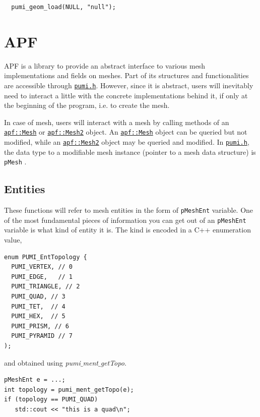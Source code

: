 \documentclass{article}
\begin{document}
\begin{lstlisting}
  pumi_geom_load(NULL, "null");
\end{lstlisting}

\section{APF}

APF is a library to provide an abstract interface to various mesh implementations and fields on meshes. Part of its structures and functionalities are accessible through \href{https://github.com/SCOREC/core/blob/master/pumi/pumi.h}{\texttt{pumi.h}}.   
However, since it is abstract, users will inevitably need to
interact a little with the concrete implementations behind it,
if only at the beginning of the program, i.e. to create the mesh.

In case of mesh, users will interact with a mesh by calling methods of an
\href{http://scorec.rpi.edu/~dibanez/core/classapf_1_1Mesh.html}{\texttt{apf::Mesh}}
or
\href{http://scorec.rpi.edu/~dibanez/core/classapf_1_1Mesh2.html}{\texttt{apf::Mesh2}}
object.
An
\href{http://scorec.rpi.edu/~dibanez/core/classapf_1_1Mesh.html}{\texttt{apf::Mesh}}
object can be queried but not modified, while an
\href{http://scorec.rpi.edu/~dibanez/core/classapf_1_1Mesh2.html}{\texttt{apf::Mesh2}}
object may be queried and modified.
In \href{https://github.com/SCOREC/core/blob/master/pumi/pumi.h}{\texttt{pumi.h}}, the data type to a modifiable mesh instance (pointer to a mesh data structure) is \texttt{pMesh} .
\subsection{Entities}

These functions will refer to mesh entities in the
form of \texttt{pMeshEnt} variable.
One of the most fundamental pieces of information you can get
out of an \texttt{pMeshEnt} variable is what kind of
entity it is.
The kind is encoded in a C++ enumeration value,
\begin{lstlisting}
enum PUMI_EntTopology {
  PUMI_VERTEX, // 0   
  PUMI_EDGE,   // 1   
  PUMI_TRIANGLE, // 2  
  PUMI_QUAD, // 3 
  PUMI_TET,  // 4
  PUMI_HEX,  // 5 
  PUMI_PRISM, // 6
  PUMI_PYRAMID // 7
);
\end{lstlisting}

and obtained using \emph{pumi$\_$ment$\_$getTopo}.

\begin{lstlisting}
pMeshEnt e = ...;
int topology = pumi_ment_getTopo(e);
if (topology == PUMI_QUAD)
   std::cout << "this is a quad\n";
\end{lstlisting}
\end{document}
